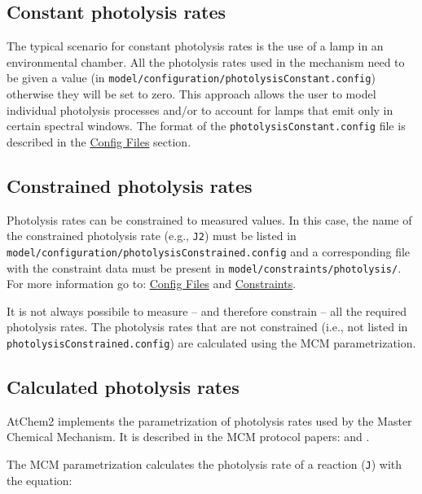 \subsection{Constant photolysis rates} \label{subsec:constant-photolysis-rates}

The typical scenario for constant photolysis rates is the use of a
lamp in an environmental chamber. All the photolysis rates used in the
mechanism need to be given a value (in
\texttt{model/configuration/photolysisConstant.config}) otherwise they
will be set to zero. This approach allows the user to model individual
photolysis processes and/or to account for lamps that emit only in
certain spectral windows. The format of the
\texttt{photolysisConstant.config} file is described in the
\hyperref[sec:config-files]{Config Files} section.

\subsection{Constrained photolysis rates} \label{subsec:constrained-photolysis-rates}

Photolysis rates can be constrained to measured values. In this case,
the name of the constrained photolysis rate (e.g., \texttt{J2}) must
be listed in\\
\texttt{model/configuration/photolysisConstrained.config} and a
corresponding file with the constraint data must be present in
\texttt{model/constraints/photolysis/}. For more information go to:
\hyperref[sec:config-files]{Config Files} and
\hyperref[sec:constraints]{Constraints}.

It is not always possibile to measure -- and therefore constrain --
all the required photolysis rates. The photolysis rates that are not
constrained (i.e., not listed in
\texttt{photolysisConstrained.config}) are calculated using the MCM
parametrization.

\subsection{Calculated photolysis rates} \label{subsec:calculated-photolysis-rates}

AtChem2 implements the parametrization of photolysis rates used by the
Master Chemical Mechanism. It is described in the MCM protocol papers:
\citep{Jenkin_1997} and \citep{Saunders_2003}.

The MCM parametrization calculates the photolysis rate of a reaction
(\texttt{J}) with the equation:

